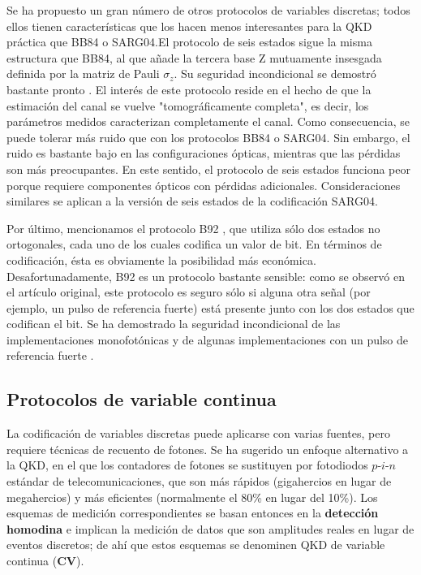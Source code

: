 \documentclass[a4paper,11pt]{book} %
\numberwithin{equation}{chapter}
\begin{document}
Se ha propuesto un gran número de otros protocolos de variables discretas; todos ellos tienen características que los hacen menos interesantes para la QKD práctica que BB84 o SARG04.El protocolo de seis estados \cite{bib_QKD_Six_state_2,bib_QKD_Six_state_3} sigue la misma estructura que BB84, al que añade la tercera base Z mutuamente insesgada definida por la matriz de Pauli $\sigma_z$. Su seguridad incondicional se demostró bastante pronto \cite{bib_QKD_Six_state_lo2001proof}. El interés de este protocolo reside en el hecho de que la estimación del canal se vuelve "tomográficamente completa", es decir, los parámetros medidos caracterizan completamente el canal. Como consecuencia, se puede tolerar más ruido que con los protocolos BB84 o SARG04. Sin embargo, el ruido es bastante bajo en las configuraciones ópticas, mientras que las pérdidas son más preocupantes. En este sentido, el protocolo de seis estados funciona peor porque requiere componentes ópticos con pérdidas adicionales. Consideraciones similares se aplican a la versión de seis estados de la codificación SARG04.

Por último, mencionamos el protocolo B92 \cite{bib_B92}, que utiliza sólo dos estados no ortogonales, cada uno de los cuales codifica un valor de bit. En términos de codificación, ésta es obviamente la posibilidad más económica. Desafortunadamente, B92 es un protocolo bastante sensible: como se observó en el artículo original, este protocolo es seguro sólo si alguna otra señal (por ejemplo, un pulso de referencia fuerte) está presente junto con los dos estados que codifican el bit. Se ha demostrado la seguridad incondicional de las implementaciones monofotónicas \cite{bib_B92_proof_1,bib_B92_proof_2} y de algunas implementaciones con un pulso de referencia fuerte \cite{bib_B92_proof_3,bib_B92_proof_4}. 




		\subsection{Protocolos de variable continua} \label{sec_sec_subsec_QKD_continua}
		
La codificación de variables discretas puede aplicarse con varias fuentes, pero requiere técnicas de recuento de fotones. Se ha sugerido un enfoque alternativo a la QKD, en el que los contadores de fotones se sustituyen por fotodiodos $p$-$i$-$n$ estándar de telecomunicaciones, que son más rápidos (gigahercios en lugar de megahercios) y más eficientes (normalmente el 80\% en lugar del 10\%). Los esquemas de medición correspondientes se basan entonces en la \textbf{detección homodina} e implican la medición de datos que son amplitudes reales en lugar de eventos discretos; de ahí que estos esquemas se denominen QKD de variable continua (\textbf{CV}).
\end{document}
